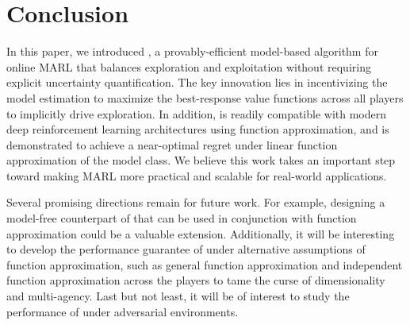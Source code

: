  
\section{Conclusion}
\label{sec:conclusion}
In this paper, we introduced \name, a provably-efficient model-based algorithm for online MARL that balances  exploration and exploitation without requiring explicit uncertainty quantification. The key innovation lies in incentivizing the model estimation to maximize the best-response value functions across all players to implicitly drive exploration. In addition, \name is readily compatible with modern deep reinforcement learning architectures using function approximation, and is demonstrated to achieve a near-optimal regret under linear function approximation of the model class. We believe this work takes an important step toward making MARL more practical and scalable for real-world applications.

Several promising directions remain for future work. For example, designing a model-free counterpart of \name that can be used in conjunction with function approximation could be a valuable extension. Additionally, it will be interesting to develop the performance guarantee of \name under alternative assumptions of function approximation, such as general function approximation and independent function approximation across the players to tame the curse of dimensionality and multi-agency. Last but not least, it will be of interest to study the performance of \name under adversarial environments.
 
